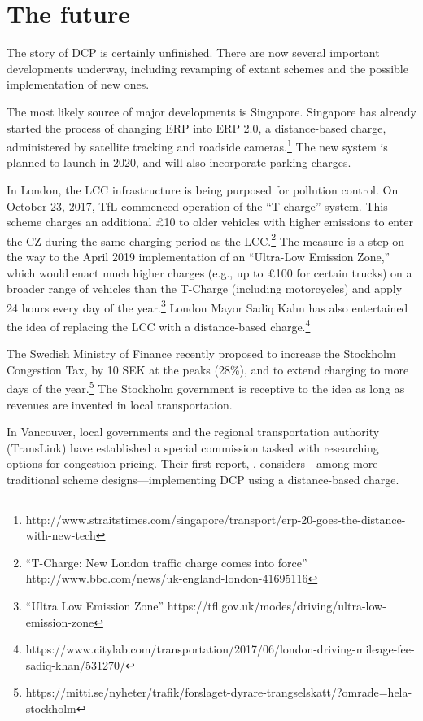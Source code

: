 \section{The future}\label{sec:future}

The story of DCP is certainly unfinished. There are now several important developments underway, including revamping of extant schemes and the possible implementation of new ones.

The most likely source of major developments is Singapore. Singapore has already started the process of changing ERP into ERP 2.0, a distance-based charge, administered by satellite tracking and roadside cameras.\footnote{http://www.straitstimes.com/singapore/transport/erp-20-goes-the-distance-with-new-tech} The new system is planned to launch in 2020, and will also incorporate parking charges.

In London, the LCC infrastructure is being purposed for pollution control. On October 23, 2017, TfL commenced operation of the ``T-charge'' system. This scheme charges an additional \pounds 10 to older vehicles with higher emissions to enter the CZ during the same charging period as the LCC.\footnote{ ``T-Charge: New London traffic charge comes into force'' http://www.bbc.com/news/uk-england-london-41695116} The measure is a step on the way to the April 2019 implementation of an ``Ultra-Low Emission Zone,'' which would enact much higher charges (e.g., up to \pounds 100 for certain trucks) on a broader range of vehicles than the T-Charge (including motorcycles) and apply 24 hours every day of the year.\footnote{``Ultra Low Emission Zone'' https://tfl.gov.uk/modes/driving/ultra-low-emission-zone} London Mayor Sadiq Kahn has also entertained the idea of replacing the LCC with a distance-based charge.\footnote{https://www.citylab.com/transportation/2017/06/london-driving-mileage-fee-sadiq-khan/531270/}

The Swedish Ministry of Finance recently proposed to increase the Stockholm Congestion Tax, by 10 SEK at the peaks (28\%), and to extend charging to more days of the year.\footnote{https://mitti.se/nyheter/trafik/forslaget-dyrare-trangselskatt/?omrade=hela-stockholm} The Stockholm government is receptive to the idea as long as revenues are invented in local transportation.

In Vancouver, local governments and the regional transportation authority (TransLink) have established a special commission tasked with researching options for congestion pricing. Their first report, \citep{vancouver2018}, considers---among more traditional scheme designs---implementing DCP using a distance-based charge. 

